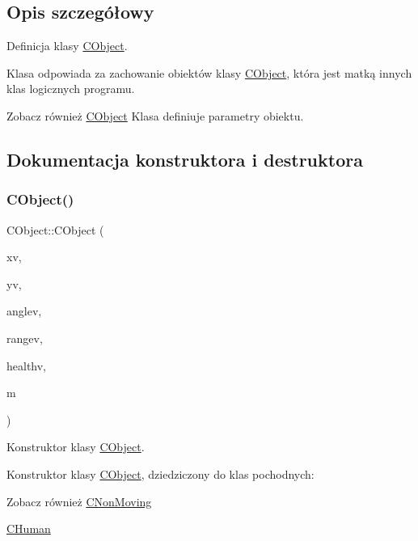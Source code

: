 \subsection{Opis szczegółowy}
Definicja klasy \mbox{\hyperlink{class_c_object}{C\+Object}}. 

Klasa odpowiada za zachowanie obiektów klasy \mbox{\hyperlink{class_c_object}{C\+Object}}, która jest matką innych klas logicznych programu. \begin{DoxySeeAlso}{Zobacz również}
\mbox{\hyperlink{class_c_object}{C\+Object}} Klasa definiuje parametry obiektu. 
\end{DoxySeeAlso}


\subsection{Dokumentacja konstruktora i destruktora}
\mbox{\label{class_c_object_a97dbcf53f475041511e92c102bd18c87}} 
\subsubsection{\texorpdfstring{C\+Object()}{CObject()}}
{\footnotesize\ttfamily C\+Object\+::\+C\+Object (\begin{DoxyParamCaption}\item[{qreal}]{xv,  }\item[{qreal}]{yv,  }\item[{qreal}]{anglev,  }\item[{qreal}]{rangev,  }\item[{qreal}]{healthv,  }\item[{\mbox{\hyperlink{class_c_map}{C\+Map}} $\ast$}]{m }\end{DoxyParamCaption})}



Konstruktor klasy \mbox{\hyperlink{class_c_object}{C\+Object}}. 

Konstruktor klasy \mbox{\hyperlink{class_c_object}{C\+Object}}, dziedziczony do klas pochodnych\+: \begin{DoxySeeAlso}{Zobacz również}
\mbox{\hyperlink{class_c_non_moving}{C\+Non\+Moving}} 

\mbox{\hyperlink{class_c_human}{C\+Human}} 
\end{DoxySeeAlso}

